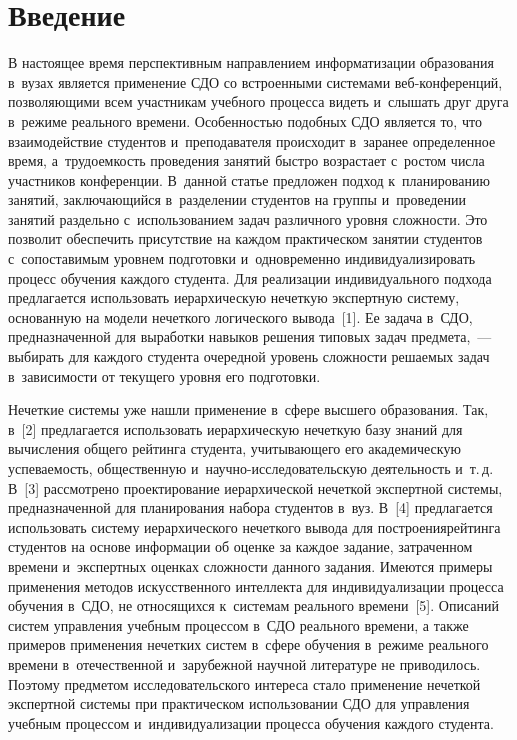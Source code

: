 


\thispagestyle{headings}

\begin{multicols}{2}

\label{st\stat}
  
\section{Введение}
  
  В настоящее время перспективным направлением информатизации 
образования в~вузах является применение СДО 
со встроенными системами веб-кон\-фе\-рен\-ций, позволяющими всем 
участникам учебного процесса видеть и~слышать друг друга в~режиме 
реального времени. Особенностью подоб\-ных СДО является то, что 
взаимодействие студентов и~преподавателя происходит в~заранее определенное 
время, а~трудоемкость проведения занятий быст\-ро возрастает с~ростом числа 
участников конференции. В~данной статье предложен подход к~планированию 
занятий, заключающийся в~разделении студентов на группы и~проведении 
занятий раздельно с~использованием задач различного уровня слож\-ности. Это 
позволит обеспечить присутствие на каждом практическом занятии студентов 
с~сопоставимым уровнем подготовки и~одновременно индивидуализировать 
процесс обуче\-ния каждого студента. Для реализации индивидуального подхода 
предлагается использовать иерархическую нечеткую экспертную сис\-те\-му, 
основанную на модели нечеткого логического вывода~[1]. Ее задача 
в~СДО, предназначенной для выработки навыков решения типовых задач 
предмета,~--- выбирать для каждого студента очередной уровень сложности 
решаемых задач в~зависимости от текущего уровня его подготовки. 
  
  Нечеткие системы уже нашли применение в~сфере высшего образования. 
Так, в~[2] предлагается использовать иерархическую нечеткую базу знаний для 
вычисления общего рейтинга студента, учитывающего его академическую 
успе\-ва\-емость, общественную и~на\-уч\-но-ис\-сле\-до\-ва\-тель\-скую 
деятельность и~т.\,д. В~[3] рассмотрено проектирование иерархической 
нечеткой экспертной сис\-те\-мы, предназначенной для планирования набора 
студентов в~вуз. В~[4] предлагается использовать систему иерархического 
нечеткого вывода для построения\linebreak рейтинга студентов на основе информации об 
оценке за каждое задание, затраченном времени и~экспертных оценках 
сложности данного задания. Имеют\-ся примеры применения методов 
искусственного интеллекта для индивидуализации процесса обучения в~СДО, 
не относящихся к~сис\-те\-мам реального времени~[5]. Описаний систем 
управления учебным процессом в~СДО реального времени, а также примеров 
применения нечетких систем в~сфере обучения в~режиме реального времени 
в~отечественной и~зарубежной научной литературе не приводилось. Поэтому 
предметом исследовательского интереса стало применение нечеткой 
экспертной системы при практическом использовании СДО для управления 
учебным процессом и~индивидуализации процесса обучения каждого студента.


\end{multicols}
